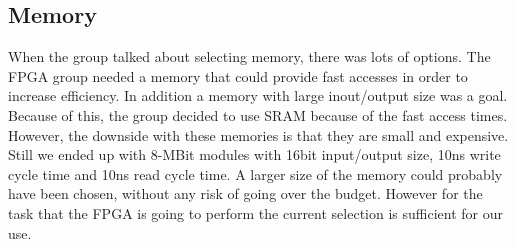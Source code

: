 \subsection{Memory} \label{pcb:design-choices:ss:memory}
When the group talked about selecting memory, there was lots of options.
The FPGA group needed a memory that could provide fast accesses in order to increase efficiency.
In addition a memory with large inout/output size was a goal.
Because of this, the group decided to use SRAM because of the fast access times.
However, the downside with these memories is that they are small and expensive.
Still we ended up with 8-MBit modules with 16bit input/output size, 10ns write cycle time and 10ns read cycle time.
A larger size of the memory could probably have been chosen, without any risk of going over the budget.
However for the task that the FPGA is going to perform the current selection is sufficient for our use.

